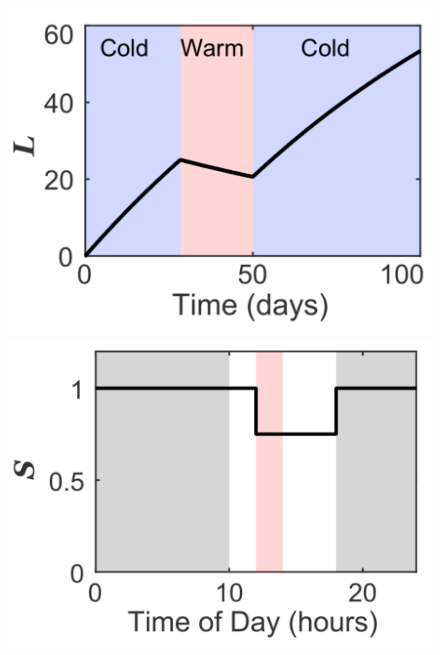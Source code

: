 \documentclass[11pt, a4paper]{article}
\begin{document}
\newpage
\begin{figure}[h!]
    \centering
    \begin{minipage}{0.4\textwidth}
        \centering
        \includegraphics[width=1.0\textwidth]{./images/param_L.png}
    \end{minipage}
    \hfill
    \begin{minipage}{0.4\textwidth}
        \centering
        \includegraphics[width=1.0\textwidth]{./images/param_S.png}
    \end{minipage}
\end{figure}
\end{document}
